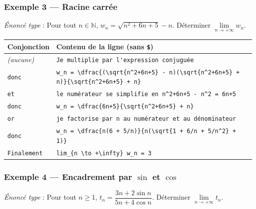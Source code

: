 \documentclass[11pt,a4paper]{article}
\begin{document}
\subsubsection*{Exemple 3 — Racine carrée}

\emph{Énoncé type} : \og Pour tout \(n \in \mathbb{N}\),
\(w_n = \sqrt{n^2 + 6n + 5} - n\). Déterminer
\(\lim\limits_{n \to +\infty} w_n\). \fg

\begin{center}
\footnotesize
\renewcommand{\arraystretch}{1.3}
\begin{tabular}{@{}p{2.4cm}p{11.8cm}@{}}
\toprule
\textbf{Conjonction} & \textbf{Contenu de la ligne (sans \texttt{\$})} \\
\midrule
\emph{(aucune)} & \verb|Je multiplie par l'expression conjuguée| \\
\texttt{donc}   & \verb|w_n = \dfrac{(\sqrt{n^2+6n+5} - n)(\sqrt{n^2+6n+5} + n)}{\sqrt{n^2+6n+5} + n}| \\
\texttt{et}     & \verb|le numérateur se simplifie en n^2+6n+5 - n^2 = 6n+5| \\
\texttt{donc}   & \verb|w_n = \dfrac{6n+5}{\sqrt{n^2+6n+5} + n}| \\
\texttt{or}     & \verb|je factorise par n au numérateur et au dénominateur| \\
\texttt{donc}   & \verb|w_n = \dfrac{n(6 + 5/n)}{n(\sqrt{1 + 6/n + 5/n^2} + 1)}| \\
\texttt{Finalement} & \verb|lim_{n \to +\infty} w_n = 3| \\
\bottomrule
\end{tabular}
\end{center}

\subsubsection*{Exemple 4 — Encadrement par \(\sin\) et \(\cos\)}

\emph{Énoncé type} : \og Pour tout \(n \geqslant 1\),
\(t_n = \dfrac{3n + 2\sin n}{5n + 4\cos n}\). Déterminer
\(\lim\limits_{n \to +\infty} t_n\). \fg
\end{document}
